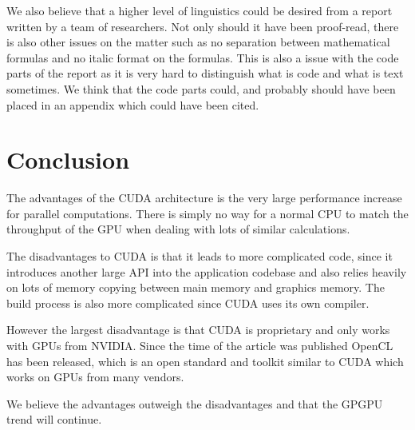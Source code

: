 \documentclass[titlepage, a4paper]{article}
\begin{document}
We also believe that a higher level of linguistics could be desired from a report written by a team of researchers. Not only should it have been proof-read, there is also other issues on the matter such as no separation between mathematical formulas and no italic format on the formulas. This is also a issue with the code parts of the report as it is very hard to distinguish what is code and what is text sometimes. We think that the code parts could, and probably should have been placed in an appendix which could have been cited.

\section{Conclusion}\label{sec:conclusion}
The advantages of the CUDA architecture is the very large performance increase for parallel computations. There is simply no way for a normal CPU to match the throughput of the GPU when dealing with lots of similar calculations.

The disadvantages to CUDA is that it leads to more complicated code, since it introduces another large API into the application codebase and also relies heavily on lots of memory copying between main memory and graphics memory. The build process is also more complicated since CUDA uses its own compiler.

However the largest disadvantage is that CUDA is proprietary and only works with GPUs from NVIDIA. Since the time of the article was published OpenCL has been released, which is an open standard and toolkit similar to CUDA which works on GPUs from many vendors.

We believe the advantages outweigh the disadvantages and that the GPGPU trend will continue.
\end{document}
